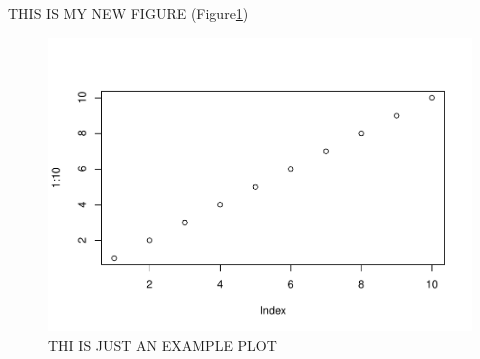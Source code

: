 \documentclass[
]{article}
\begin{document}
THIS IS MY NEW FIGURE (Figure\ref{fig:NEWCODECHUNK})

\begin{figure}
\centering
\includegraphics{Testing_files/figure-latex/NEWCODECHUNK-1.pdf}
\caption{\label{fig:NEWCODECHUNK}THI IS JUST AN EXAMPLE PLOT}
\end{figure}
\end{document}
